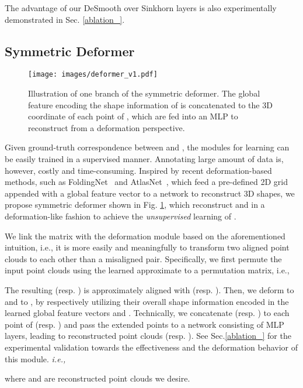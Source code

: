 \documentclass[final]{cvpr}
\begin{document}
The advantage of our DeSmooth over Sinkhorn layers is also experimentally demonstrated in Sec. \ref{ablation_}. 





\subsection{Symmetric Deformer}\label{Sec_deformer}

\begin{figure}[t]
  \centering
  \texttt{[image: images/deformer\_v1.pdf]}
  \caption{Illustration of one branch of the symmetric deformer. The global feature   encoding the shape information of   is concatenated to the 3D coordinate of each point of , which are fed into an MLP to reconstruct  from a deformation perspective. }
  \label{ci}
\end{figure}


Given ground-truth correspondence between  and , the modules for learning  can be easily trained in a supervised manner. Annotating large amount of data is, however, costly and time-consuming. Inspired by recent deformation-based methods, such as FoldingNet~\cite{yang2018foldingnet} and AtlasNet~\cite{groueix2018papier}, which feed a pre-defined 2D grid appended with a global feature vector to a network to reconstruct 3D shapes, we propose symmetric deformer shown in Fig. \ref{ci}, which reconstruct  and  in a deformation-like fashion to achieve the \textit{unsupervised} learning of .  


We link the matrix  with the deformation module based on the aforementioned intuition, i.e.,  it is  more  easily  and  meaningfully to transform two aligned point clouds to each other  than  a  misaligned  pair. 
Specifically,
we first permute the input point clouds using the learned  approximate to a permutation matrix, i.e.,  

The resulting  (resp. ) is approximately aligned with  (resp. ). Then, we deform  to  and  to ,
by respectively utilizing their overall shape information encoded in  the learned global feature vectors 
 and .
Technically, we concatenate  (resp. ) to each point of  (resp. ) and pass the extended points to a network consisting of MLP layers, leading to reconstructed point clouds  (resp. ).  See Sec.\ref{ablation_} for the experimental validation towards the effectiveness and the deformation behavior of this module. 
\textit{i.e.,}


where  and  are reconstructed point clouds we desire.
\fi
\end{document}
